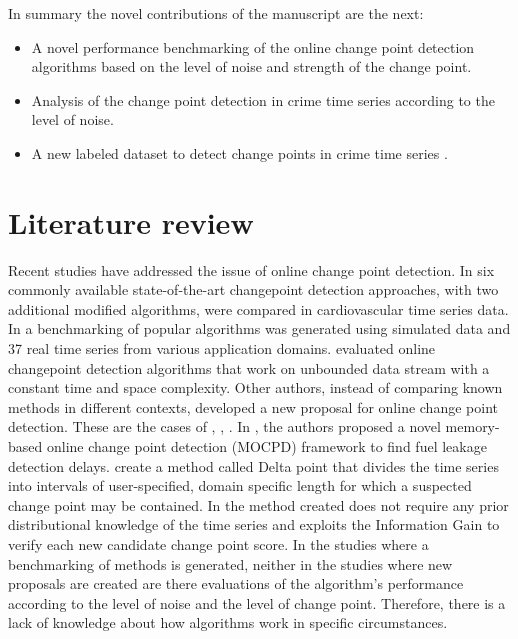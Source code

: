 \documentclass[journal,article,submit,pdftex,moreauthors]{Definitions/mdpi}
\begin{document}
In summary the novel contributions of the manuscript are the next:
\begin{itemize}
    \item A novel performance benchmarking of the online change point detection algorithms based on the level of noise and strength of the change point.
    \item Analysis of the change point detection in crime time series according to the level of noise.
    \item A new labeled dataset to detect change points in crime time series .
\end{itemize}


\section{Literature review}
Recent studies have addressed the issue of online change point detection.  In \cite{cakmak2024benchmarking} six commonly available state-of-the-art changepoint detection approaches, with two additional modified algorithms, were compared in cardiovascular time series data. In \cite{van2020evaluation} a benchmarking of popular algorithms was generated using simulated data and 37 real time series from various application domains. \cite{wang2021online} evaluated online changepoint detection algorithms that work on unbounded data stream with a constant time and space complexity. Other authors, instead of comparing known methods in different contexts, developed a new proposal for online change point detection. These are the cases of \cite{chu2025real}, \cite{zameni2020unsupervised}, \cite{gold2018doubly}. In \cite{chu2025real}, the authors proposed a novel memory-based online change point detection (MOCPD) framework to find fuel leakage detection delays. \cite{gold2018doubly} create a method called Delta point that divides the time series into intervals of user-specified, domain specific length for which a suspected change point may be contained. In \cite{zameni2020unsupervised} the method created does not require any prior distributional knowledge of the time series and exploits the Information Gain to verify each new candidate change point score. In the studies where a benchmarking of methods is generated, neither in the studies where new proposals are created are there evaluations of the algorithm’s performance according to the level of noise and the level of change point. Therefore, there is a lack of knowledge about how algorithms work in specific circumstances.
\end{document}
